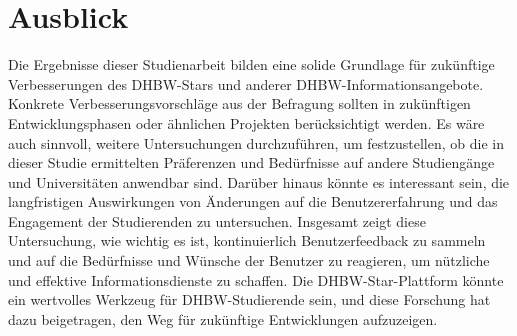 \section{Ausblick}
Die Ergebnisse dieser Studienarbeit bilden eine solide Grundlage für zukünftige Verbesserungen des DHBW-Stars und anderer DHBW-Informationsangebote. Konkrete Verbesserungsvorschläge aus der Befragung sollten in zukünftigen Entwicklungsphasen oder ähnlichen Projekten berücksichtigt werden. 
Es wäre auch sinnvoll, weitere Untersuchungen durchzuführen, um festzustellen, ob die in dieser Studie ermittelten Präferenzen und Bedürfnisse auf andere Studiengänge und Universitäten anwendbar sind. Darüber hinaus könnte es interessant sein, die langfristigen Auswirkungen von Änderungen auf die Benutzererfahrung und das Engagement der Studierenden zu untersuchen. 
Insgesamt zeigt diese Untersuchung, wie wichtig es ist, kontinuierlich Benutzerfeedback zu sammeln und auf die Bedürfnisse und Wünsche der Benutzer zu reagieren, um nützliche und effektive Informationsdienste zu schaffen. Die DHBW-Star-Plattform könnte ein wertvolles Werkzeug für DHBW-Studierende sein, und diese Forschung hat dazu beigetragen, den Weg für zukünftige Entwicklungen aufzuzeigen.